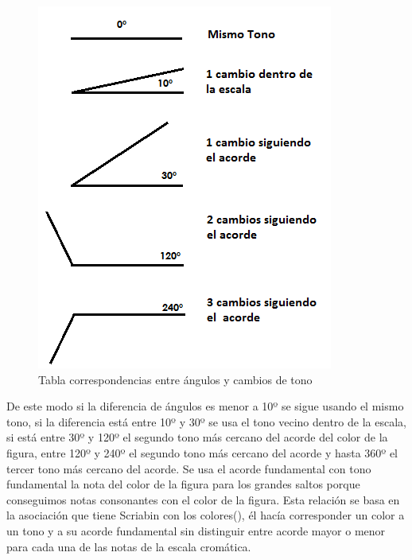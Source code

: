 		\begin{figure}[htbp]
		\centering
		\hspace*{0.0in}
		\includegraphics[scale=0.75]{graphics/tabla-corresp-Tono-Angulo.png}
		\caption{Tabla correspondencias entre ángulos y cambios de tono}
		\label{fig:Figura3Voz1}
		\end{figure}

De este modo si la diferencia de ángulos es menor a 10º se sigue usando el mismo tono, si la diferencia está entre 10º y 30º se usa el tono vecino dentro de la escala, si está entre 30º y 120º el segundo tono más cercano del acorde del color de la figura, entre 120º y 240º el segundo tono más cercano del acorde y hasta 360º el tercer tono más cercano del acorde. Se usa el acorde fundamental con tono fundamental la nota del color de la figura para los grandes saltos porque conseguimos notas consonantes con el color de la figura. Esta relación se basa en la asociación que tiene Scriabin con los colores(\cite{ScriabinQuintasColor}), él hacía corresponder un color a un tono y a su acorde fundamental sin distinguir entre acorde mayor o menor para cada una de las notas de la escala cromática.

